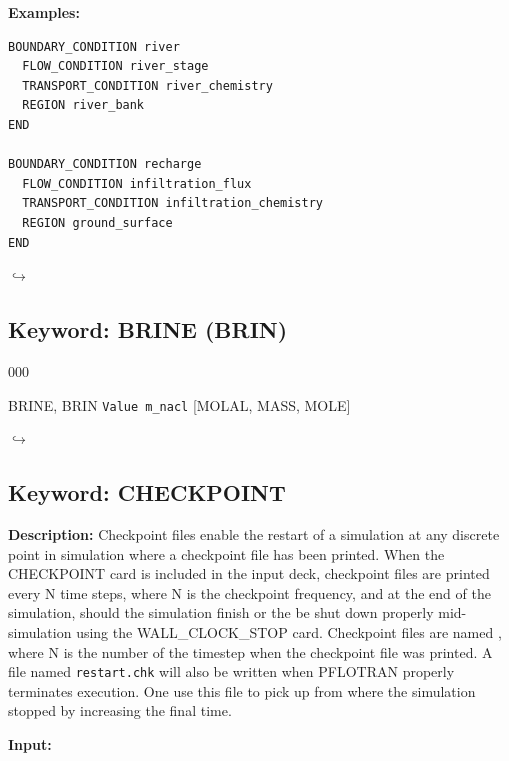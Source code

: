 \documentclass[12pt]{article}
\newcommand\return{{\hfill$\hookrightarrow$}}
\begin{document}
{\noindent\bf Examples:}
\begin{verbatim}
BOUNDARY_CONDITION river
  FLOW_CONDITION river_stage
  TRANSPORT_CONDITION river_chemistry
  REGION river_bank
END

BOUNDARY_CONDITION recharge
  FLOW_CONDITION infiltration_flux
  TRANSPORT_CONDITION infiltration_chemistry
  REGION ground_surface
END
\end{verbatim}

\hyperlink{target_key}{\return}


\newpage
\protect\hypertarget{target_brine}{}

\subsection{Keyword: BRINE (BRIN)}

\begin{deflist}{000}
\item[BRINE, BRIN] {\tt Value m\_nacl} [MOLAL, MASS, MOLE]
\end{deflist}

\hyperlink{target_key}{\return}


\newpage
\protect\hypertarget{target_ckpt}{}

\subsection{Keyword: CHECKPOINT}
{\noindent\bf Description:}
Checkpoint files enable the restart of a simulation at any discrete point in simulation where a checkpoint file has been printed.  When the CHECKPOINT card is included in the input deck, checkpoint files are printed every N time steps, where N is the checkpoint frequency, and at the end of the simulation, should the simulation finish or the be shut down properly mid-simulation using the WALL\_CLOCK\_STOP card.  Checkpoint files are named , where N is the number of the timestep when the checkpoint file was printed.
A file named {\tt restart.chk} will also be written when PFLOTRAN properly terminates execution. One use this file to pick up from where the simulation stopped by increasing the final time.

{\noindent\bf Input:}
\end{document}
